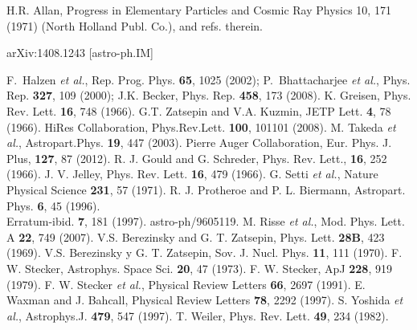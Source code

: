 \begin{thebibliography}{1}
 H.R. Allan, Progress in Elementary Particles and Cosmic Ray Physics 10, 171 (1971) (North Holland Publ. Co.), and refs. therein.

 arXiv:1408.1243 [astro-ph.IM]

F.~Halzen {\it et al.}, Rep. Prog. Phys. {\bf 65}, 1025 (2002);\newline
P.~Bhattacharjee {\it et al.}, Phys. Rep. {\bf 327}, 109 (2000);\newline
J.K. Becker, Phys. Rep. {\bf 458}, 173 (2008). 
 K. Greisen, Phys. Rev. Lett. \textbf{16}, 748 (1966).
 G.T. Zatsepin and V.A. Kuzmin, JETP Lett. \textbf{4}, 78 (1966).
 HiRes Collaboration, Phys.Rev.Lett. \textbf{100}, 101101 (2008).
  M. Takeda {\it et al.}, Astropart.Phys. \textbf{19}, 447 (2003).
 Pierre Auger Collaboration, Eur. Phys. J. Plus, \textbf{127}, 87 (2012).
 R. J. Gould and G. Schreder, Phys. Rev. Lett., \textbf{16}, 252 (1966).
  J. V. Jelley, Phys. Rev. Lett. \textbf{16}, 479 (1966).
 G. Setti {\it et al.}, Nature Physical Science \textbf{231}, 57 (1971).
 R. J. Protheroe and P. L. Biermann, Astropart. Phys. \textbf{6}, 45 (1996).\\
Erratum-ibid. \textbf{7}, 181 (1997). astro-ph/9605119.
 M. Risse {\it et al.}, Mod. Phys. Lett. A \textbf{22}, 749 (2007).
 V.S. Berezinsky and G. T. Zatsepin, Phys. Lett. {\bf 28B}, 423 (1969).\newline
V.S. Berezinsky y G. T. Zatsepin, Sov. J. Nucl. Phys. {\bf 11}, 111 (1970).
 F. W. Stecker, Astrophys. Space Sci. {\bf 20}, 47 (1973).\newline
F. W. Stecker, ApJ {\bf 228}, 919 (1979).
 F. W. Stecker  {\it et al.}, Physical Review Letters \textbf{66}, 2697 (1991).
 E. Waxman and J. Bahcall,  Physical Review Letters \textbf{78}, 2292 (1997).
 S. Yoshida {\it et al.}, Astrophys.J. \textbf{479}, 547 (1997).
 T. Weiler,  Phys. Rev. Lett. \textbf{49}, 234 (1982).

\end{thebibliography}
